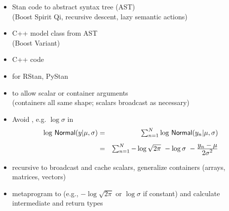 \documentclass[10pt]{report}
\begin{document}
%
\begin{itemize}
\item Stan code  to abstract syntax tree (AST)
  \\ {\footnotesize (Boost Spirit Qi, recursive descent, lazy semantic
    actions)}
\item C++ model class  from AST
  \\ {\footnotesize (Boost Variant)}
\item C++ code 
\item {} for RStan, PyStan
\end{itemize}


%
\begin{itemize}
\item {} to allow scalar or container arguments
  \\ {\footnotesize (containers all same shape; scalars broadcast as necessary)}
\item Avoid , e.g. $\log \sigma$ in
  \hspace*{-18pt}
  {\small
    \begin{eqnarray*}
      \textstyle \log \, \mbox{\sf Normal}(y | \mu, \sigma)
      & = & \textstyle \sum_{n=1}^N \log \, \mbox{\sf Normal}(y_n | \mu,\sigma)
      \\[4pt]
      & = & \textstyle \sum_{n=1}^N  - \log \sqrt{2\pi} \ - \log \sigma \ -
      \frac{\textstyle y_n - \mu}{\textstyle 2\sigma^2}
    \end{eqnarray*}
  }
\item recursive  to broadcast and cache scalars,
  generalize containers (arrays, matrices, vectors)
\item {} metaprogram to  (e.g., $-\log
  \sqrt{2 \pi}$ or $\log \sigma$ if constant)
  and calculate intermediate and return types
\end{itemize}
\end{document}
